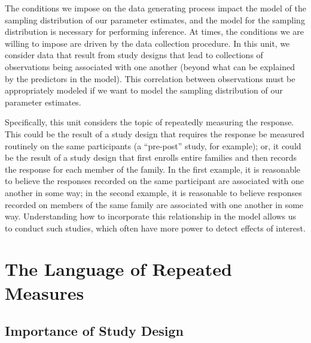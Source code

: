 \documentclass[
  letterpaper,
  DIV=11,
  numbers=noendperiod]{scrreprt}
\theoremstyle{definition}
\theoremstyle{definition}
\theoremstyle{remark}
\begin{document}
The conditions we impose on the data generating process impact the model
of the sampling distribution of our parameter estimates, and the model
for the sampling distribution is necessary for performing inference. At
times, the conditions we are willing to impose are driven by the data
collection procedure. In this unit, we consider data that result from
study designs that lead to collections of observations being associated
with one another (beyond what can be explained by the predictors in the
model). This correlation between observations must be appropriately
modeled if we want to model the sampling distribution of our parameter
estimates.

Specifically, this unit considers the topic of repeatedly measuring the
response. This could be the result of a study design that requires the
response be measured routinely on the same participants (a ``pre-post''
study, for example); or, it could be the result of a study design that
first enrolls entire families and then records the response for each
member of the family. In the first example, it is reasonable to believe
the responses recorded on the same participant are associated with one
another in some way; in the second example, it is reasonable to believe
responses recorded on members of the same family are associated with one
another in some way. Understanding how to incorporate this relationship
in the model allows us to conduct such studies, which often have more
power to detect effects of interest.

\hypertarget{sec-rm-terminology}{%
\chapter{The Language of Repeated Measures}\label{sec-rm-terminology}}

\providecommand{\norm}[1]{\left\lVert#1\right\rVert}
\providecommand{\abs}[1]{\left\lvert#1\right\rvert}
\providecommand{\dist}[1]{\stackrel{\text{#1}}{\sim}}
\providecommand{\ind}[1]{\mathbb{I}\left(#1\right)}
\providecommand{\bm}[1]{\mathbf{#1}}
\providecommand{\bs}[1]{\boldsymbol{#1}}
\providecommand{\Ell}{\mathcal{L}}
\providecommand{\indep}{\perp\negthickspace\negmedspace\perp}

\hypertarget{importance-of-study-design}{%
\section{Importance of Study Design}\label{importance-of-study-design}}
\end{document}

